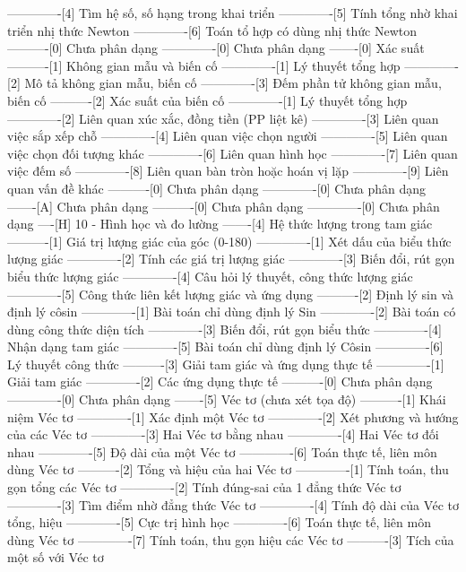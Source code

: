 -------------[4] Tìm hệ số, số hạng trong khai triển
-------------[5] Tính tổng nhờ khai triển nhị thức Newton
-------------[6] Toán tổ hợp có dùng nhị thức Newton
----------[0] Chưa phân dạng
-------------[0] Chưa phân dạng
-------[0] Xác suất
----------[1] Không gian mẫu và biến cố
-------------[1] Lý thuyết tổng hợp
-------------[2] Mô tả không gian mẫu, biến cố
-------------[3] Đếm phần tử không gian mẫu, biến cố
----------[2] Xác suất của biến cố
-------------[1] Lý thuyết tổng hợp
-------------[2] Liên quan xúc xắc, đồng tiền (PP liệt kê)
-------------[3] Liên quan việc sắp xếp chỗ
-------------[4] Liên quan việc chọn người
-------------[5] Liên quan việc chọn đối tượng khác
-------------[6] Liên quan hình học
-------------[7] Liên quan việc đếm số
-------------[8] Liên quan bàn tròn hoặc hoán vị lặp
-------------[9] Liên quan vấn đề khác
----------[0] Chưa phân dạng
-------------[0] Chưa phân dạng
-------[A] Chưa phân dạng
----------[0] Chưa phân dạng
-------------[0] Chưa phân dạng
----[H] 10 - Hình học và đo lường
-------[4] Hệ thức lượng trong tam giác
----------[1] Giá trị lượng giác của góc (0-180)
-------------[1] Xét dấu của biểu thức lượng giác
-------------[2] Tính các giá trị lượng giác
-------------[3] Biến đổi, rút gọn biểu thức lượng giác
-------------[4] Câu hỏi lý thuyết, công thức lượng giác
-------------[5] Công thức liên kết lượng giác và ứng dụng
----------[2] Định lý sin và định lý côsin
-------------[1] Bài toán chỉ dùng định lý Sin 
-------------[2] Bài toán có dùng công thức diện tích
-------------[3] Biến đổi, rút gọn biểu thức
-------------[4] Nhận dạng tam giác
-------------[5] Bài toán chỉ dùng định lý Côsin
-------------[6] Lý thuyết công thức
----------[3] Giải tam giác và ứng dụng thực tế
-------------[1] Giải tam giác
-------------[2] Các ứng dụng thực tế
----------[0] Chưa phân dạng
-------------[0] Chưa phân dạng
-------[5] Véc tơ (chưa xét tọa độ)
----------[1] Khái niệm Véc tơ
-------------[1] Xác định một Véc tơ
-------------[2] Xét phương và hướng của các Véc tơ
-------------[3] Hai Véc tơ bằng nhau
-------------[4] Hai Véc tơ đối nhau
-------------[5] Độ dài của một Véc tơ
-------------[6] Toán thực tế, liên môn dùng Véc tơ
----------[2] Tổng và hiệu của hai Véc tơ
-------------[1] Tính toán, thu gọn tổng các Véc tơ
-------------[2] Tính đúng-sai của 1 đẳng thức Véc tơ
-------------[3] Tìm điểm nhờ đẳng thức Véc tơ
-------------[4] Tính độ dài của Véc tơ tổng, hiệu
-------------[5] Cực trị hình học
-------------[6] Toán thực tế, liên môn dùng Véc tơ
-------------[7] Tính toán, thu gọn hiệu các Véc tơ
----------[3] Tích của một số với Véc tơ

